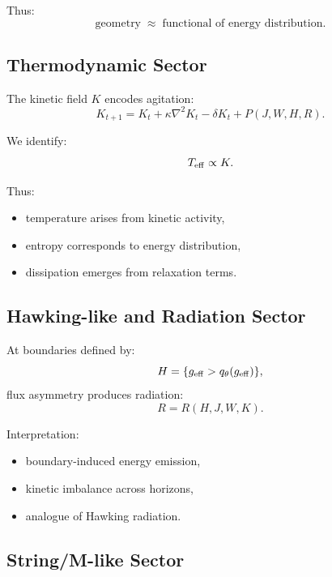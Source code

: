 \documentclass[11pt]{article}
\begin{document}
Thus:
\begin{equation}
\text{geometry} \;\approx\; \text{functional of energy distribution}.
\end{equation}

\subsection{Thermodynamic Sector}

The kinetic field $K$ encodes agitation:
\begin{equation}
K_{t+1} = K_t + \kappa \nabla^2 K_t - \delta K_t + P(J,W,H,R).
\end{equation}

We identify:
\begin{equation}
T_{\rm eff} \propto K.
\end{equation}

Thus:
\begin{itemize}
\item temperature arises from kinetic activity,
\item entropy corresponds to energy distribution,
\item dissipation emerges from relaxation terms.
\end{itemize}

\subsection{Hawking-like and Radiation Sector}

At boundaries defined by:
\begin{equation}
H = \{g_{\rm eff} > q_\theta(g_{\rm eff})\},
\end{equation}
flux asymmetry produces radiation:
\begin{equation}
R = R(H,J,W,K).
\end{equation}

Interpretation:
\begin{itemize}
\item boundary-induced energy emission,
\item kinetic imbalance across horizons,
\item analogue of Hawking radiation.
\end{itemize}

\subsection{String/M-like Sector}
\end{document}
